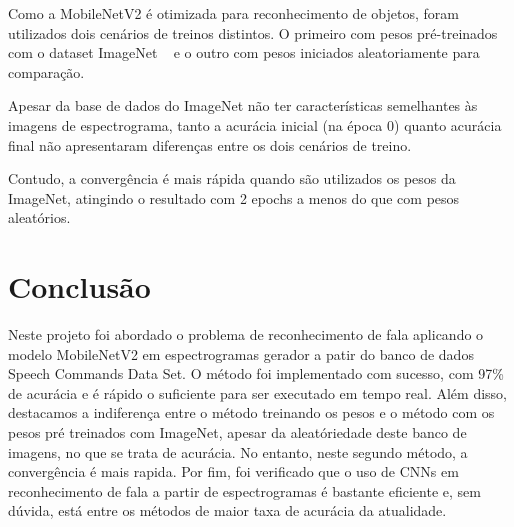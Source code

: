 \documentclass{bmvc2k}
\begin{document}
Como a MobileNetV2 é otimizada para reconhecimento de objetos, foram utilizados 
dois cenários de treinos distintos. O primeiro com pesos pré-treinados com o dataset
ImageNet ~\cite{imagenet} e o outro com pesos iniciados aleatoriamente para comparação. 

Apesar da base de dados do ImageNet não ter características semelhantes às imagens de espectrograma,
tanto a acurácia inicial (na época 0) quanto acurácia final não apresentaram diferenças
entre os dois cenários de treino.

Contudo, a convergência é mais rápida quando são utilizados os pesos da ImageNet,
atingindo o resultado com 2 epochs a menos do que com pesos aleatórios.


\section{Conclusão}

Neste projeto foi abordado o problema de reconhecimento de fala aplicando o modelo MobileNetV2 em espectrogramas gerador a patir do banco de dados Speech Commands Data Set. O método foi implementado com sucesso, com 97\% de acurácia e é rápido o suficiente para ser executado em tempo real.
Além disso, destacamos a indiferença entre o método treinando os pesos e o método com os pesos pré treinados com ImageNet, apesar da aleatóriedade deste banco de imagens, no que se trata de acurácia. No entanto, neste segundo método, a convergência é mais rapida.
Por fim, foi verificado que o uso de CNNs em reconhecimento de fala a partir de
espectrogramas é bastante eficiente e, sem dúvida, está entre os métodos de maior
taxa de acurácia da atualidade.


\end{document}
